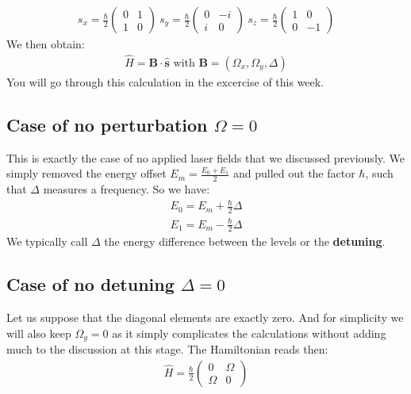 \begin{align}
s_x = \frac{\hbar}{2}\left(\begin{array}{cc}
0 & 1\\
1 &  0
\end{array}
\right)~
s_y = \frac{\hbar}{2}\left(\begin{array}{cc}
0 & -i\\
i &  0
\end{array}
\right)~s_z =\frac{\hbar}{2} \left(\begin{array}{cc}
1 & 0\\
0 &  -1
\end{array}
\right)
\end{align}
We then obtain:
\begin{align}\label{Eq:HamSpin}
\hat{H} = \mathbf{B}\cdot\hat{\mathbf{s}}\text{ with }\mathbf{B} = (\Omega_x, \Omega_y, \Delta)
\end{align}
You will go through this calculation in the excercise of this week.

\subsection{Case of no perturbation $\Omega = 0$}

This is exactly the case of no applied laser fields that we discussed previously. We simply removed the energy offset $E_m = \frac{E_0+E_1}{2}$ and pulled out the factor $\hbar$, such that $\Delta$ measures a frequency. So we have:
\begin{align}
E_0 = E_m+ \frac{\hbar}{2}\Delta\\
E_1 = E_m- \frac{\hbar}{2}\Delta
\end{align}
We typically call $\Delta$ the energy difference between the levels or the \textbf{detuning}.

\subsection{Case of no detuning $\Delta = 0$}

Let us suppose that the diagonal elements are exactly zero. And for simplicity we will also keep $\Omega_y =0$ as it simply complicates the calculations without adding much to the discussion at this stage. The Hamiltonian reads then:
\begin{align}
\hat{H} = \frac{\hbar}{2}\left( \begin{array}{cc} 0  & \Omega\\ \Omega &0 \end{array} \right)
\end{align}


